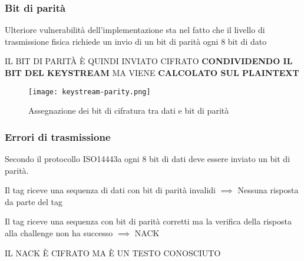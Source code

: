 \begin{frame}
    \frametitle{Bit di parità}
    \label{sec:parity-enc}
    Ulteriore vulnerabilità dell'implementazione sta nel fatto che il livello di trasmissione fisica richiede 
    un invio di un bit di parità ogni 8 bit di dato

    IL BIT DI PARITÀ È QUINDI INVIATO CIFRATO \textbf{CONDIVIDENDO IL BIT DEL KEYSTREAM} MA VIENE \textbf{CALCOLATO SUL PLAINTEXT}\cite{Courtois2009TheDS}

    \begin{figure}
        \centering
        \texttt{[image: keystream-parity.png]}
        \caption{Assegnazione dei bit di cifratura tra dati e bit di parità}
        \label{fig:keystream-parity}
    \end{figure}
\end{frame}

\begin{frame}
    \frametitle{Errori di trasmissione}
    \label{sec:parity-bit-vuln}
    Secondo il protocollo ISO14443a ogni 8 bit di dati deve essere inviato un bit di parità.\pause

    Il tag riceve una sequenza di dati con bit di parità invalidi $\implies$ Nessuna risposta da parte del tag\pause

    Il tag riceve una sequenza con bit di parità corretti ma la verifica della risposta alla challenge non ha successo $\implies$ NACK\pause

    {\large IL NACK È CIFRATO MA È UN TESTO CONOSCIUTO}
\end{frame}
